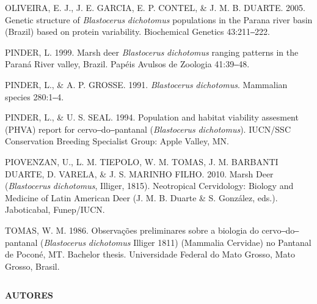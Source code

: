 \documentclass[
  x11names]{article}
\begin{document}
OLIVEIRA, E. J., J. E. GARCIA, E. P. CONTEL, \& J. M. B. DUARTE. 2005.
Genetic structure of \textit{Blastocerus} \textit{dichotomus}
populations in the Parana river basin (Brazil) based on protein
variability. Biochemical Genetics 43:211‒222.

PINDER, L. 1999. Marsh deer \textit{Blastocerus} \textit{dichotomus}
ranging patterns in the Paraná River valley, Brazil. Papéis Avulsos de
Zoologia 41:39‒48.

PINDER, L., \& A. P. GROSSE. 1991. \textit{Blastocerus}
\textit{dichotomus}. Mammalian species 280:1‒4.

PINDER, L., \& U. S. SEAL. 1994. Population and habitat viability
assesment (PHVA) report for cervo‒do‒pantanal (\textit{Blastocerus}
\textit{dichotomus}). IUCN/SSC Conservation Breeding Specialist Group:
Apple Valley, MN.~

PIOVENZAN, U., L. M. TIEPOLO, W. M. TOMAS, J. M. BARBANTI DUARTE, D.
VARELA, \& J. S. MARINHO FILHO. 2010. Marsh Deer (\textit{Blastocerus}
\textit{dichotomus}, Illiger, 1815). Neotropical Cervidology: Biology
and Medicine of Latin American Deer (J. M. B. Duarte \& S. González,
eds.). Jaboticabal, Funep/IUCN.

TOMAS, W. M. 1986. Observações preliminares sobre a biologia do
cervo‒do‒pantanal (\textit{Blastocerus} \textit{dichotomus} Illiger
1811) (Mammalia Cervidae) no Pantanal de Poconé, MT. Bachelor thesis.
Universidade Federal do Mato Grosso, Mato Grosso, Brasil.

\setlength{\parindent}{0pt}

\newpage

%
\begin{table}[H]
\centering
\begin{tabular}[t]{>{\raggedright\arraybackslash}m{16cm}>{}m{16cm}}
\toprule
\cellcolor{ceil}{\textcolor{white}{\textbf{\rule{0pt}{14pt}AUTORES}}}\\
\bottomrule
\end{tabular}
\end{table}

\textbf{AUTORES}
\end{document}
